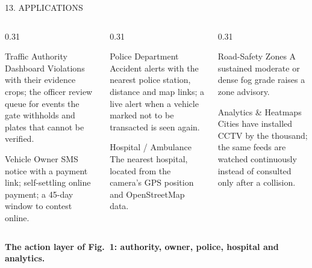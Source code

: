 \documentclass[aspectratio=169,10pt,t]{beamer}
\begin{document}
\begin{frame}{13. APPLICATIONS}
\small
\vspace{0.3em}
\begin{columns}[T,onlytextwidth]
\begin{column}{0.31\textwidth}
\begin{block}{Traffic Authority Dashboard}
Violations with their evidence crops; the officer review queue for events the gate withholds and plates that cannot
be verified.
\end{block}
\begin{block}{Vehicle Owner}
SMS notice with a payment link; self-settling online payment; a 45-day window to contest online.
\end{block}
\end{column}
\begin{column}{0.31\textwidth}
\begin{block}{Police Department}
Accident alerts with the nearest police station, distance and map links; a live alert when a vehicle marked not to be
transacted is seen again.
\end{block}
\begin{block}{Hospital / Ambulance}
The nearest hospital, located from the camera's GPS position and OpenStreetMap data.
\end{block}
\end{column}
\begin{column}{0.31\textwidth}
\begin{block}{Road-Safety Zones}
A sustained moderate or dense fog grade raises a zone advisory.
\end{block}
\begin{block}{Analytics \& Heatmaps}
Cities have installed CCTV by the thousand; the same feeds are watched continuously instead of consulted only after a
collision.
\end{block}
\end{column}
\end{columns}
\vspace{0.4em}
{\centering\color{dsblue}\textbf{The action layer of Fig.~1: authority, owner, police, hospital and analytics.}\par}
\end{frame}
\end{document}
